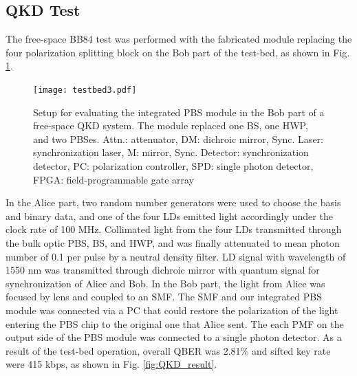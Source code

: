 \documentclass[letterpaper, 10pt]{article}
\begin{document}
\subsection{QKD Test}
The free-space BB84 test was performed with the fabricated module replacing the four polarization splitting block on the Bob part of the test-bed, as shown in Fig. \ref{fig:testbed}.
\begin{figure}
  \centering
  \texttt{[image: testbed3.pdf]}
  \caption{Setup for evaluating the integrated PBS module in the Bob part of a free-space QKD system. The module replaced one BS, one HWP, and two PBSes. Attn.: attenuator, DM: dichroic mirror, Sync. Laser: synchronization laser, M: mirror, Sync. Detector: synchronization detector, PC: polarization controller, SPD: single photon detector, FPGA: field-programmable gate array}
  \label{fig:testbed}
\end{figure}
In the Alice part, two random number generators were used to choose the basis and binary data, and one of the four LDs emitted light accordingly under the clock rate of 100 MHz.
Collimated light from the four LDs transmitted  through the bulk optic PBS, BS, and HWP, and was finally attenuated to mean photon number of 0.1 per pulse by a neutral density filter.
LD signal with wavelength of 1550 nm was transmitted through dichroic mirror with quantum signal for synchronization of Alice and Bob.
In the Bob part, the light from Alice was  focused by lens and coupled to an SMF.
The SMF and our integrated PBS module was connected via a PC that could restore the polarization of the light entering the PBS chip to the original one that Alice sent.
The each PMF on the output side of the PBS module was connected to a single photon detector.
As a result of the test-bed operation, overall QBER was 2.81\% and sifted key rate were 415 kbps, as shown in Fig. \ref{fig:QKD_result}.
\end{document}
